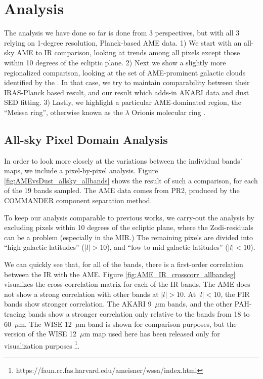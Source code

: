 \documentclass[preprint2,longabstract]{aastex}
\begin{document}
\section{Analysis}
\label{sec:analysis}

The analysis we have done so far is done from 3 perspectives, but with all 3 relying on 1-degree resolution, Planck-based AME data. 1) We start with an all-sky AME to IR comparison, looking at trends among all pixels except those within 10 degrees of the ecliptic plane. 2) Next we show a slightly more regionalized comparison, looking at the set of AME-prominent galactic clouds identified by the \cite{planckXV}. In that case, we try to maintain comparability between their IRAS-Planck based result, and our result which adds-in AKARI data and dust SED fitting. 3) Lastly, we highlight a particular AME-dominated region, the ``Meissa ring'', otherwise known as the $\lambda$ Orionis molecular ring \citep{maddalena86,maddalena87}.

\subsection{All-sky Pixel Domain Analysis}

	In order to look more closely at the variations between the individual bands' maps, we include a pixel-by-pixel analysis. Figure \ref{fig:AMEvsDust_allsky_allbands} shows the result of such a comparison, for each of the 19 bands sampled. The AME data comes from PR2, produced by the COMMANDER component separation method.

    To keep our analysis comparable to previous works, we carry-out the analysis by excluding pixels within 10 degrees of the ecliptic plane, where the Zodi-residuals can be a problem (especially in the MIR.) The remaining pixels are divided into ``high galactic latitudes'' ($|l|>10$), and ``low to mid galactic latitudes'' ($|l|<10$).

    We can quickly see that, for all of the bands, there is a first-order correlation between the IR with the AME. Figure \ref{fig:AME_IR_crosscorr_allbandsg} visualizes the cross-correlation matrix for each of the IR bands. The AME does not show a strong correlation with other bands at $|l|>10$. At $|l|<10$, the FIR bands show stronger correlation. The AKARI 9~$\mu$m bands, and the other PAH-tracing bands show a stronger correlation only relative to the bands from 18 to 60~$\mu$m. The WISE 12~$\mu$m band is shown for comparison purposes, but the version of the WISE 12~$\mu$m map used here has been released only for visualization purposes \footnote{https://faun.rc.fas.harvard.edu/ameisner/wssa/index.html}.
\end{document}
